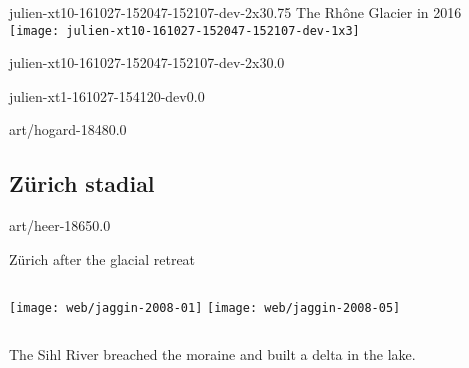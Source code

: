 \documentclass[aspectratio=1610]{beamer}
\begin{document}
    \begin{backgroundframe}{julien-xt10-161027-152047-152107-dev-2x3}{0.75}
                           {The Rhône Glacier in 2016}
      \vspace{12mm}
      \texttt{[image: julien-xt10-161027-152047-152107-dev-1x3]}
    \end{backgroundframe}

    \begin{backgroundframe}[b]{julien-xt10-161027-152047-152107-dev-2x3}{0.0}{}
      \flushleft{}
    \end{backgroundframe}

    \begin{backgroundframe}[b]{julien-xt1-161027-154120-dev}{0.0}{}
      \flushleft{}
    \end{backgroundframe}

    \begin{backgroundframe}[b]{art/hogard-1848}{0.0}{}
      \flushleft{}
    \end{backgroundframe}


\subsection{Zürich stadial}

    \begin{backgroundframe}[t]{art/heer-1865}{0.0}{}
      \flushleft{}
    \end{backgroundframe}

    \begin{frame}{Zürich after the glacial retreat}
      \begin{columns}
        \column{60mm}
          \texttt{[image: web/jaggin-2008-01]}  %
        \column{60mm}
          \texttt{[image: web/jaggin-2008-05]}  %
      \end{columns}
      \bigskip
      The Sihl River breached the moraine and built a delta in the lake.
    \end{frame}
\end{document}
